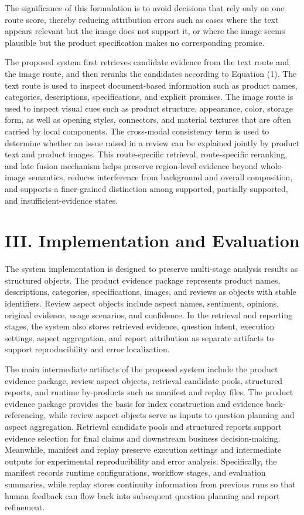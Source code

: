 \documentclass[11pt]{article}
\begin{document}
The significance of this formulation is to avoid decisions that rely only on one route score, thereby reducing attribution errors such as cases where the text appears relevant but the image does not support it, or where the image seems plausible but the product specification makes no corresponding promise.

The proposed system first retrieves candidate evidence from the text route and the image route, and then reranks the candidates according to Equation (1). The text route is used to inspect document-based information such as product names, categories, descriptions, specifications, and explicit promises. The image route is used to inspect visual cues such as product structure, appearance, color, storage form, as well as opening styles, connectors, and material textures that are often carried by local components. The cross-modal consistency term is used to determine whether an issue raised in a review can be explained jointly by product text and product images. This route-specific retrieval, route-specific reranking, and late fusion mechanism helps preserve region-level evidence beyond whole-image semantics, reduces interference from background and overall composition, and supports a finer-grained distinction among supported, partially supported, and insufficient-evidence states.

\section{III. Implementation and Evaluation}
The system implementation is designed to preserve multi-stage analysis results as structured objects. The product evidence package represents product names, descriptions, categories, specifications, images, and reviews as objects with stable identifiers. Review aspect objects include aspect names, sentiment, opinions, original evidence, usage scenarios, and confidence. In the retrieval and reporting stages, the system also stores retrieved evidence, question intent, execution settings, aspect aggregation, and report attribution as separate artifacts to support reproducibility and error localization.

The main intermediate artifacts of the proposed system include the product evidence package, review aspect objects, retrieval candidate pools, structured reports, and runtime by-products such as manifest and replay files. The product evidence package provides the basis for index construction and evidence back-referencing, while review aspect objects serve as inputs to question planning and aspect aggregation. Retrieval candidate pools and structured reports support evidence selection for final claims and downstream business decision-making. Meanwhile, manifest and replay preserve execution settings and intermediate outputs for experimental reproducibility and error analysis. Specifically, the manifest records runtime configurations, workflow stages, and evaluation summaries, while replay stores continuity information from previous runs so that human feedback can flow back into subsequent question planning and report refinement.
\end{document}
